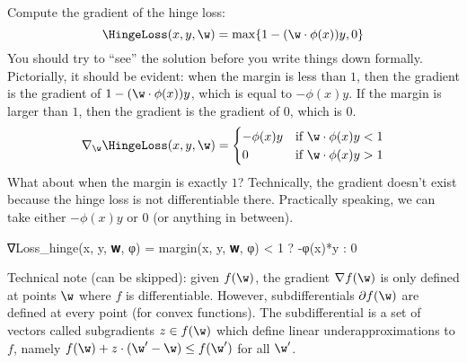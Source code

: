 \begin{overflowexample}
     Compute the gradient of the hinge loss:
    \[
        \HingeLoss(x, y, \w) = \max\{1 - (\w \cdot \phi(x)) y, 0 \}
    \]
    You should try to ``see'' the solution before you write things down formally.
    Pictorially, it should be evident: when the margin is less than $1$,
    then the gradient is the gradient of $1-(\w\cdot\phi(x))y$, which is equal to $-\phi(x) y$.
    If the margin is larger than $1$, then the gradient is the gradient of $0$, which is $0$.
    \[
        \displaystyle \nabla_{\w} \HingeLoss(x, y, \w) =
        \begin{cases}
        -\phi(x) y & \text{if $\w\cdot\phi(x) y < 1$} \\
        0 & \text{if $\w\cdot\phi(x) y > 1$}
        \end{cases}
    \]
    What about when the margin is exactly $1$?
    Technically, the gradient doesn't exist because the hinge loss is not differentiable there.
    Practically speaking, we can take either $-\phi(x) y$ or $0$ (or anything in between).
\br\\
\begin{exalgorithm}
\begin{juliaverbatim}
∇Loss_hinge(x, y, 𝐰, φ) = margin(x, y, 𝐰, φ) < 1 ? -φ(x)*y : 0
\end{juliaverbatim}
\end{exalgorithm}

    Technical note (can be skipped): given $f(\w)$, the gradient $\nabla f(\w)$ is only defined at points $\w$ where $f$ is differentiable.
    However, subdifferentials $\partial f(\w)$ are defined at every point (for convex functions).
    The subdifferential is a set of vectors called subgradients $z \in f(\w)$ which define linear underapproximations to $f$,
    namely $f(\w) + z \cdot (\w^\prime - \w) \le f(\w^\prime)$ for all $\w^\prime$.
\end{overflowexample}

